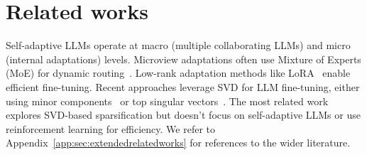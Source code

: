 \vspace{-1mm}
\section{Related works}
\label{sec:relatedworks}
\vspace{-1mm}
Self-adaptive LLMs operate at macro (multiple collaborating LLMs) and micro (internal adaptations) levels. 
Microview adaptations often use Mixture of Experts (MoE) for dynamic routing~\citep{fedus2022switch}. 
Low-rank adaptation methods like LoRA~\citep{hu2021lora} enable efficient fine-tuning. 
Recent approaches leverage SVD for LLM fine-tuning, either using minor components~\citep{wang2024milora} or top singular vectors~\citep{balazy2024lora}. 
The most related work~\citep{lingam2024svft} explores SVD-based sparsification but doesn't focus on self-adaptive LLMs or use reinforcement learning for efficiency.
We refer to Appendix~\ref{app:sec:extendedrelatedworks} for references to the wider literature.

\vspace{-2mm}